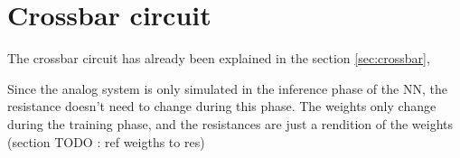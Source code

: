 \section{Crossbar circuit}
\label{sec:xbarCircuit}

The crossbar circuit has already been explained in the section \ref{sec:crossbar},

    Since the analog system is only simulated in the inference phase of the \ac{NN}, the resistance doesn't need to change during this phase. The weights only change during the training phase, and the resistances are just a rendition of the weights (section TODO : ref weigths to res)
